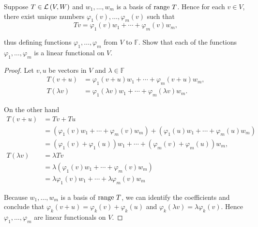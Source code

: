 \begin{exercise}
    Suppose $T \in \mathcal{L}\left({V, W}\right)$ and $w_{1} , \ldots, w_{m}$ is a basis of $\operatorname{range}\,{T}$. Hence for each $v\in V$, there exist unique numbers $\varphi_{1} (v), \ldots, \varphi_{m} (v)$ such that
    \[
        Tv = \varphi_{1}(v)w_{1} + \cdots + \varphi_{m}(v)w_{m},
    \]

    thus defining functions $\varphi_{1}, \ldots, \varphi_{m}$ from $V$ to $\mathbb{F}$. Show that each of the functions $\varphi_{1}, \ldots, \varphi_{m}$ is a linear functional on $V$.
\end{exercise}

\begin{proof}
    Let $v, u$ be vectors in $V$ and $\lambda\in\mathbb{F}$
    \begin{align*}
        T(v + u)     & = \varphi_{1}(v + u)w_{1} + \cdots + \varphi_{m}(v + u)w_{m},         \\
        T(\lambda v) & = \varphi_{1}(\lambda v)w_{1} + \cdots + \varphi_{m}(\lambda v)w_{m}.
    \end{align*}

    On the other hand
    \begin{align*}
        T(v + u)     & = Tv + Tu                                                                                                     \\
                     & = (\varphi_{1}(v)w_{1} + \cdots + \varphi_{m}(v)w_{m}) + (\varphi_{1}(u)w_{1} + \cdots + \varphi_{m}(u)w_{m}) \\
                     & = (\varphi_{1}(v) + \varphi_{1}(u))w_{1} + \cdots + (\varphi_{m}(v) + \varphi_{m}(u))w_{m},                   \\
        T(\lambda v) & = \lambda Tv                                                                                                  \\
                     & = \lambda (\varphi_{1}(v)w_{1} + \cdots + \varphi_{m}(v)w_{m})                                                \\
                     & = \lambda\varphi_{1}(v)w_{1} + \cdots + \lambda\varphi_{m}(v)w_{m}
    \end{align*}

    Because $w_{1} , \ldots, w_{m}$ is a basis of $\operatorname{range}\,{T}$, we can identify the coefficients and conclude that $\varphi_{k}(v + u) = \varphi_{k}(v) + \varphi_{k}(u)$ and $\varphi_{k}(\lambda v) = \lambda \varphi_{k}(v)$. Hence $\varphi_{1}, \ldots, \varphi_{m}$ are linear functionals on $V$.
\end{proof}
\newpage

